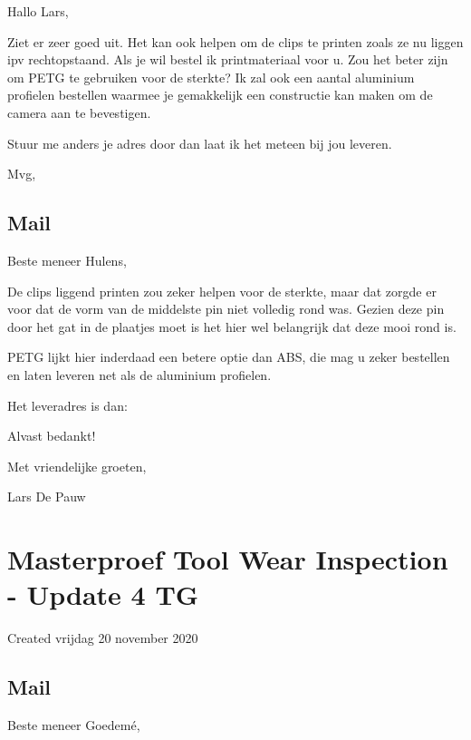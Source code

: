 \documentclass{article}
\begin{document}
Hallo Lars,



Ziet er zeer goed uit. Het kan ook helpen om de clips te printen zoals ze nu liggen ipv rechtopstaand. Als je wil bestel ik printmateriaal voor u. Zou het beter zijn om PETG te gebruiken voor de sterkte? Ik zal ook een aantal aluminium profielen bestellen waarmee je gemakkelijk een constructie kan maken om de camera aan te bevestigen.



Stuur me anders je adres door dan laat ik het meteen bij jou leveren.



Mvg,



\subsection{Mail}

Beste meneer Hulens,

 

De clips liggend printen zou zeker helpen voor de sterkte, maar dat zorgde er voor dat de vorm van de middelste pin niet volledig rond was. Gezien deze pin door het gat in de plaatjes moet is het hier wel belangrijk dat deze mooi rond is.

 

PETG lijkt hier inderdaad een betere optie dan ABS, die mag u zeker bestellen en laten leveren net als de aluminium profielen.

 

Het leveradres is dan:



 

Alvast bedankt!

Met vriendelijke groeten,

 

Lars De Pauw


		\section{Masterproef Tool Wear Inspection - Update 4 TG}

Created vrijdag 20 november 2020



\subsection{Mail}

Beste meneer Goedemé,
\end{document}
